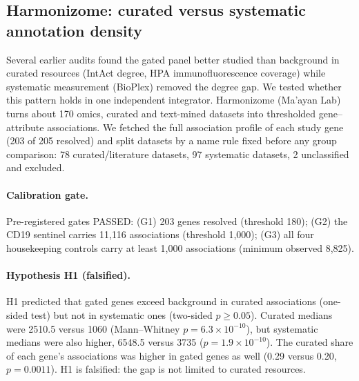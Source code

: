 \subsection{Harmonizome: curated versus systematic annotation density}
\label{sec:harmonizome}
Several earlier audits found the gated panel better studied than background
in curated resources (IntAct degree, HPA immunofluorescence coverage) while
systematic measurement (BioPlex) removed the degree gap. We tested whether
this pattern holds in one independent integrator. Harmonizome (Ma'ayan Lab)
turns about 170 omics, curated and text-mined datasets into thresholded
gene--attribute associations. We fetched the full association profile of
each study gene (203 of 205 resolved) and split datasets by a name
rule fixed before any group comparison: 78 curated/literature datasets,
97 systematic datasets, 2 unclassified and excluded.

\paragraph{Calibration gate.} Pre-registered gates PASSED: (G1) 203
genes resolved (threshold 180); (G2) the CD19 sentinel carries 11{,}116
associations (threshold 1{,}000); (G3) all four housekeeping controls carry at
least 1{,}000 associations (minimum observed 8{,}825).

\paragraph{Hypothesis H1 (falsified).} H1 predicted that gated genes exceed
background in curated associations (one-sided test) but not in systematic
ones (two-sided $p\ge 0.05$). Curated medians were 2510.5 versus 1060
(Mann--Whitney $p=6.3\times10^{-10}$), but systematic medians were also higher,
6548.5 versus 3735 ($p=1.9\times10^{-10}$). The curated share of each gene's
associations was higher in gated genes as well (0.29 versus 0.20,
$p=0.0011$). H1 is falsified: the gap is not limited to curated resources.

